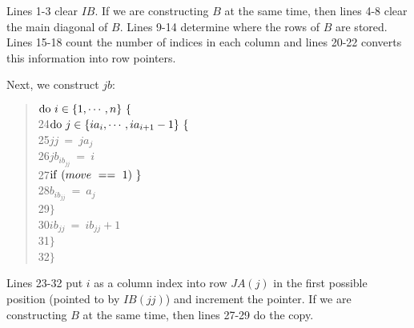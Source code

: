 Lines 1-3 clear $IB$.  If we are constructing $B$ at the same time, then lines
4-8 clear the main diagonal of $B$.  Lines 9-14 determine where the rows of
$B$ are stored.  Lines 15-18 count the number of indices in each column and
lines 20-22 converts this information into row pointers.

Next, we construct $jb$:
\begin{quote}\hspace*{ 4em}$ {\rm do}\ i\in\{1,\cdots,n\}\ \{ $ \\
24\hspace*{ 8em}$     {\rm do}\ j\in\{ia_{i},\cdots,ia_{i+1}-1\}\ \{ $ \\
25\hspace*{12em}$         jj\ =\ ja_{j} $ \\
26\hspace*{12em}$         jb_{ib_{jj}}\ =\ i $ \\
27\hspace*{12em}$         {\rm if}\ (move\ ==\ 1)\ \} $ \\
28\hspace*{16em}$             b_{ib_{jj}}\ =\ a_{j} $ \\
29\hspace*{16em}$             \} $ \\
30\hspace*{12em}$         ib_{jj}\ =\ ib_{jj}+1 $ \\
31\hspace*{12em}$         \} $ \\
32\hspace*{ 8em}$     \} $
\end{quote}     
Lines 23-32 put $i$ as a column index into row $JA(j)$ in the first possible
position (pointed to by $IB(jj)$) and increment the pointer.  If we are
constructing $B$ at the same time, then lines 27-29 do the copy.

